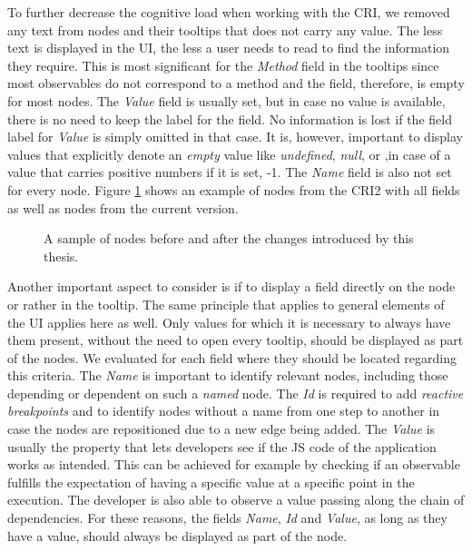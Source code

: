 To further decrease the cognitive load when working with the CRI, we removed any text from nodes and their tooltips that does not carry any value. The less text is displayed in the UI, the less a user needs to read to find the information they require. This is most significant for the \emph{Method} field in the tooltips since most observables do not correspond to a method and the field, therefore, is empty for most nodes. The \emph{Value} field is usually set, but in case no value is available, there is no need to keep the label for the field. No information is lost if the field label for \emph{Value} is simply omitted in that case.
It is, however, important to display values that explicitly denote an \emph{empty} value like \emph{undefined}, \emph{null}, or ,in case of a value that carries positive numbers if it is set, -1. The \emph{Name} field is also not set for every node. Figure \ref{fig:Nodes} shows an example of nodes from the CRI2 with all fields as well as nodes from the current version.
\begin{figure}[!h]
	\centering
	\hfill
	\caption{A sample of nodes before and after the changes introduced by this thesis.}
	\label{fig:Nodes}
\end{figure}
Another important aspect to consider is if to display a field directly on the node or rather in the tooltip. The same principle that applies to general elements of the UI applies here as well. Only values for which it is necessary to always have them present, without the need to open every tooltip, should be displayed as part of the nodes. We evaluated for each field where they should be located regarding this criteria. The \emph{Name} is important to identify relevant nodes, including those depending or dependent on such a \emph{named} node. The \emph{Id} is required to add \emph{reactive breakpoints} and to identify nodes without a name from one step to another in case the nodes are repositioned due to a new edge being added. The \emph{Value} is usually the property that lets developers see if the JS code of the application works as intended. This can be achieved for example by checking if an observable fulfills the expectation of having a specific value at a specific point in the execution. The developer is also able to observe a value passing along the chain of dependencies. For these reasons, the fields \emph{Name}, \emph{Id} and \emph{Value}, as long as they have a value, should always be displayed as part of the node.
